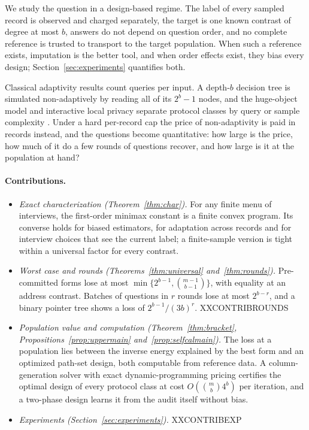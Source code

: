 \documentclass{article}
\begin{document}
We study the question in a design-based regime. The label of every sampled record is observed and charged separately, the target is one known contrast of degree at most $b$, answers do not depend on question order, and no complete reference is trusted to transport to the target population. When such a reference exists, imputation is the better tool, and when order effects exist, they bias every design; Section~\ref{sec:experiments} quantifies both.

Classical adaptivity results count queries per input. A depth-$b$ decision tree is simulated non-adaptively by reading all of its $2^b-1$ nodes, and the huge-object model and interactive local privacy separate protocol classes by query or sample complexity \citep{goldreich2022,adar2024,joseph2019,joseph2020}. Under a hard per-record cap the price of non-adaptivity is paid in records instead, and the questions become quantitative: how large is the price, how much of it do a few rounds of questions recover, and how large is it at the population at hand?

\paragraph{Contributions.}
\begin{itemize}\itemsep1pt\parskip0pt
\item \emph{Exact characterization (Theorem~\ref{thm:char}).} For any finite menu of interviews, the first-order minimax constant is a finite convex program. Its converse holds for biased estimators, for adaptation across records and for interview choices that see the current label; a finite-sample version is tight within a universal factor for every contrast.
\item \emph{Worst case and rounds (Theorems~\ref{thm:universal} and~\ref{thm:rounds}).} Pre-committed forms lose at most $\min\{2^{b-1},\binom{m-1}{b-1}\}$, with equality at an address contrast. Batches of questions in $r$ rounds lose at most $2^{b-r}$, and a binary pointer tree shows a loss of $2^{b-1}/(3b)^r$. XXCONTRIBROUNDS
\item \emph{Population value and computation (Theorem~\ref{thm:bracket}, Propositions~\ref{prop:uppermain} and~\ref{prop:selfcalmain}).} The loss at a population lies between the inverse energy explained by the best form and an optimized path-set design, both computable from reference data. A column-generation solver with exact dynamic-programming pricing certifies the optimal design of every protocol class at cost $O(\binom mb4^b)$ per iteration, and a two-phase design learns it from the audit itself without bias.
\item \emph{Experiments (Section~\ref{sec:experiments}).} XXCONTRIBEXP
\end{itemize}
\end{document}
